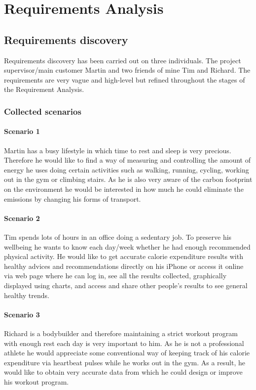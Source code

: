 \documentclass[12pt, a4paper]{report}   %
\begin{document}
\chapter{Requirements Analysis}

\section{Requirements discovery}
Requirements discovery has been carried out on three individuals. The project supervisor/main customer Martin and two friends of mine Tim and Richard. The requirements are very vague and high-level but refined throughout the stages of the Requirement Analysis.

\subsection{Collected scenarios}
\subsubsection*{Scenario 1}
Martin has a busy lifestyle in which time to rest and sleep is very precious. Therefore he would like to find a way of measuring and controlling the amount of energy he uses doing certain activities such as walking, running, cycling, working out in the gym or climbing stairs. As he is also very aware of the carbon footprint on the environment he would be interested in how much he could eliminate the emissions by changing his forms of transport.

\subsubsection*{Scenario 2}
Tim spends lots of hours in an office doing a sedentary job. To preserve his wellbeing he wants to know each day/week whether he had enough recommended physical activity. He would like to get accurate calorie expenditure results with healthy advices and recommendations directly on his iPhone or access it online via web page where he can log in, see all the results collected, graphically displayed using charts, and access and share other people’s results to see general healthy trends.


\subsubsection*{Scenario 3}
Richard is a bodybuilder and therefore maintaining a strict workout program with enough rest each day is very important to him. As he is not a professional athlete he would appreciate some conventional way of keeping track of his calorie expenditure via heartbeat pulses while he works out in the gym. As a result, he would like to obtain very accurate data from which he could design or improve his workout program.
\end{document}
